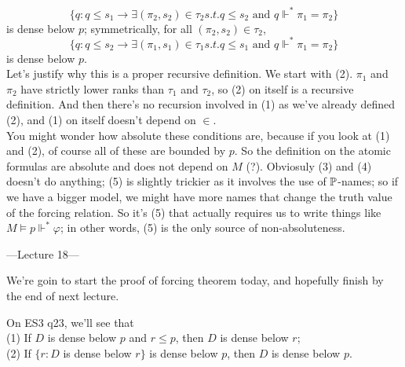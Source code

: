 \documentclass[a4paper]{article}
\begin{document}
\begin{defi}
\[
\{q: q \leq s_1 \to \exists (\pi_2,s_2) \in \tau_2 s.t. q \leq s_2 \text{ and } q \Vdash^* \pi_1 = \pi_2\}
\]
is dense below $p$; symmetrically, for all $(\pi_2,s_2) \in \tau_2$,
\[
\{q: q \leq s_2 \to \exists (\pi_1,s_1) \in \tau_1 s.t. q \leq s_1 \text{ and } q \Vdash^* \pi_1 = \pi_2\}
\]
is dense below $p$.\\
Let's justify why this is a proper recursive definition. We start with (2). $\pi_1$ and $\pi_2$ have strictly lower ranks than $\tau_1$ and $\tau_2$, so (2) on itself is a recursive definition. And then there's no recursion involved in (1) as we've already defined (2), and (1) on itself doesn't depend on $\in$.\\
You might wonder how absolute these conditions are, because if you look at (1) and (2), of course all of these are bounded by $p$. So the definition on the atomic formulas are absolute and does not depend on $M$ (?). Obviosuly (3) and (4) doesn't do anything; (5) is slightly trickier as it involves the use of $\P$-names; so if we have a bigger model, we might have more names that change the truth value of the forcing relation. So it's (5) that actually requires us to write things like $M \vDash p \Vdash^*\varphi$; in other words, (5) is the only source of non-absoluteness.
\end{defi}

---Lecture 18---

We're goin to start the proof of forcing theorem today, and hopefully finish by the end of next lecture.

On ES3 q23, we'll see that\\
(1) If $D$ is dense below $p$ and $r \leq p$, then $D$ is dense below $r$;\\
(2) If $\{r:D$ is dense below $r\}$ is dense below $p$, then $D$ is dense below $p$.
\end{document}
